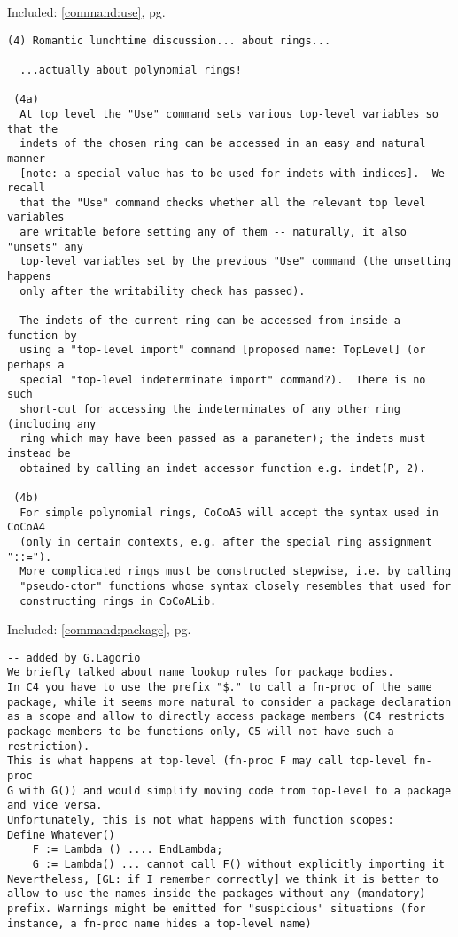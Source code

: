 \documentclass{book}[12,a4paper]
\def\refandpage#1{{\ref{#1}, pg.\pageref{#1}}}
\begin{document}
Included: \refandpage{command:use}
\begin{verbatim}
(4) Romantic lunchtime discussion... about rings...

  ...actually about polynomial rings!

 (4a)
  At top level the "Use" command sets various top-level variables so that the
  indets of the chosen ring can be accessed in an easy and natural manner
  [note: a special value has to be used for indets with indices].  We recall
  that the "Use" command checks whether all the relevant top level variables
  are writable before setting any of them -- naturally, it also "unsets" any
  top-level variables set by the previous "Use" command (the unsetting happens
  only after the writability check has passed).

  The indets of the current ring can be accessed from inside a function by
  using a "top-level import" command [proposed name: TopLevel] (or perhaps a
  special "top-level indeterminate import" command?).  There is no such
  short-cut for accessing the indeterminates of any other ring (including any
  ring which may have been passed as a parameter); the indets must instead be
  obtained by calling an indet accessor function e.g. indet(P, 2).

 (4b)
  For simple polynomial rings, CoCoA5 will accept the syntax used in CoCoA4
  (only in certain contexts, e.g. after the special ring assignment "::=").
  More complicated rings must be constructed stepwise, i.e. by calling
  "pseudo-ctor" functions whose syntax closely resembles that used for
  constructing rings in CoCoALib.
\end{verbatim}

Included: \refandpage{command:package}
\begin{verbatim}
-- added by G.Lagorio
We briefly talked about name lookup rules for package bodies.
In C4 you have to use the prefix "$." to call a fn-proc of the same 
package, while it seems more natural to consider a package declaration 
as a scope and allow to directly access package members (C4 restricts 
package members to be functions only, C5 will not have such a restriction).
This is what happens at top-level (fn-proc F may call top-level fn-proc 
G with G()) and would simplify moving code from top-level to a package 
and vice versa.
Unfortunately, this is not what happens with function scopes:
Define Whatever()
    F := Lambda () .... EndLambda;
    G := Lambda() ... cannot call F() without explicitly importing it
Nevertheless, [GL: if I remember correctly] we think it is better to 
allow to use the names inside the packages without any (mandatory) 
prefix. Warnings might be emitted for "suspicious" situations (for 
instance, a fn-proc name hides a top-level name)
\end{verbatim}


\printindex
\end{document}
